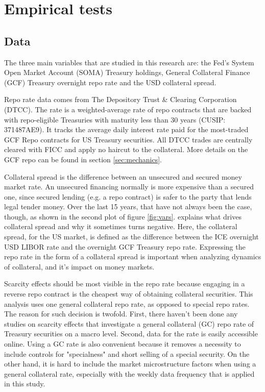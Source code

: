 \documentclass[11pt,a4paper,english,oneside]{article}
\begin{document}
\clearpage 
 
\section{Empirical tests} \label{sec:empirical}

\subsection{Data} \label{sec:data}

The three main variables that are studied in this research are: the Fed's System Open Market Account (SOMA) Treasury holdings, General Collateral Finance (GCF) Treasury overnight repo rate and the USD collateral spread.

Repo rate data comes from The Depository Trust \& Clearing Corporation (DTCC). The rate is a weighted-average rate of repo contracts that are backed with repo-eligible Treasuries with maturity less than 30 years (CUSIP: 371487AE9). It tracks the average daily interest rate paid for the most-traded GCF Repo contracts for US Treasury securities. All DTCC trades are centrally cleared with FICC and apply no haircut to the collateral. More details on the GCF repo can be found in section \ref{sec:mechanics}.

Collateral spread is the difference between an unsecured and secured money market rate. An unsecured financing normally is more expensive than a secured one, since secured lending (e.g. a repo contract) is safer to the party that lends legal tender money. Over the last 15 years, that have not always been the case, though, as shown in the second plot of figure \ref{fig:vars}. \citet{nyborg2019a} explains what drives collateral spread and why it sometimes turns negative. Here, the collateral spread, for the US market, is defined as the difference between the ICE overnight USD LIBOR rate and the overnight GCF Treasury repo rate. Expressing the repo rate in the form of a collateral spread is important when analyzing dynamics of collateral, and it's impact on money markets.

Scarcity effects should be most visible in the repo rate because engaging in a reverse repo contract is the cheapest way of obtaining collateral securities. This analysis uses one general collateral repo rate, as opposed to special repo rates. The reason for such decision is twofold. First, there haven't been done any studies on scarcity effects that investigate a general collateral (GC) repo rate of Treasury securities on a macro level. Second, data for the rate is easily accessible online. Using a GC rate is also convenient because it removes a necessity to include controls for "specialness" and short selling of a special security. On the other hand, it is hard to include the market microstructure factors when using a general collateral rate, especially with the weekly data frequency that is applied in this study.
\end{document}
